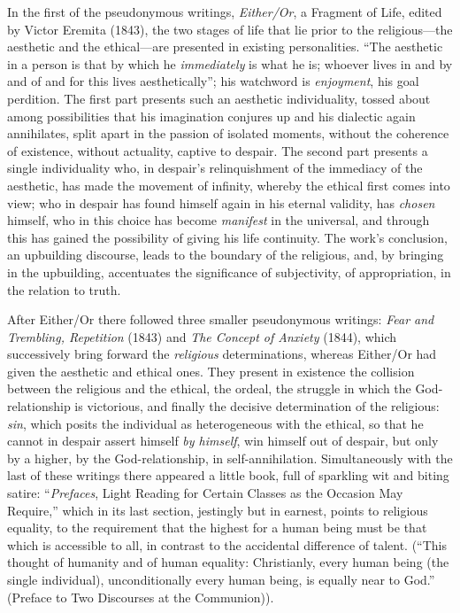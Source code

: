 \documentclass[12pt,a4paper]{article}
\begin{document}
In the first of the pseudonymous writings, \emph{Either/Or}, a Fragment of Life,
edited by Victor Eremita (1843), the two stages of life that lie prior to the
religious---the aesthetic and the ethical---are presented in existing
personalities. ``The aesthetic in a person is that by which he \emph{immediately} is what
he is; whoever lives in and by and of and for this lives aesthetically''; his
watchword is \emph{enjoyment}, his goal perdition. The first part presents such an
aesthetic individuality, tossed about among possibilities that his imagination
conjures up and his dialectic again annihilates, split apart in the passion of
isolated moments, without the coherence of existence, without actuality, captive
to despair. The second part presents a single individuality who, in despair's
relinquishment of the immediacy of the aesthetic, has made the movement of
infinity, whereby the ethical first comes into view; who in despair has found
himself again in his eternal validity, has \emph{chosen} himself, who in this choice has
become \emph{manifest} in the universal, and through this has gained the possibility of
giving his life continuity. The work's conclusion, an upbuilding discourse, leads
to the boundary of the religious, and, by bringing in the upbuilding, accentuates
the significance of subjectivity, of appropriation, in the relation to truth.

After Either/Or there followed three smaller pseudonymous writings:
\emph{Fear and Trembling, Repetition} (1843) and \emph{The Concept of
Anxiety} (1844), which successively bring forward the \emph{religious} determinations,
whereas Either/Or had given the aesthetic and ethical ones. They present in
existence the collision between the religious and the ethical, the ordeal, the
struggle in which the God-relationship is victorious, and finally the decisive
determination of the religious: \emph{sin}, which posits the individual as heterogeneous
with the ethical, so that he cannot in despair assert himself \emph{by himself}, win
himself out of despair, but only by a higher, by the God-relationship, in
self-annihilation. Simultaneously with the last of these writings there appeared a
little book, full of sparkling wit and biting satire: ``\emph{Prefaces}, Light Reading
for Certain Classes as the Occasion May Require,'' which in its last section,
jestingly but in earnest, points to religious equality, to the requirement that
the highest for a human being must be that which is accessible to all, in contrast
to the accidental difference of talent. (``This thought of humanity and of human
equality: Christianly, every human being (the single individual), unconditionally
every human being, is equally near to God.'' (Preface to Two Discourses at the
Communion)).
\end{document}
